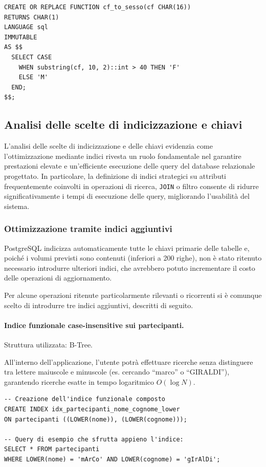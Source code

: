 \documentclass[11pt,a4paper]{article}
\begin{document}
\begin{verbatim}
CREATE OR REPLACE FUNCTION cf_to_sesso(cf CHAR(16))
RETURNS CHAR(1)
LANGUAGE sql
IMMUTABLE
AS $$
  SELECT CASE
    WHEN substring(cf, 10, 2)::int > 40 THEN 'F'
    ELSE 'M'
  END;
$$;
\end{verbatim}

\subsection{Analisi delle scelte di indicizzazione e chiavi}

L'analisi delle scelte di indicizzazione e delle chiavi evidenzia come l'ottimizzazione mediante
indici rivesta un ruolo fondamentale nel garantire prestazioni elevate e un'efficiente
esecuzione delle query del database relazionale progettato. In particolare, la definizione di
indici strategici su attributi frequentemente coinvolti in operazioni di ricerca, \texttt{JOIN} o filtro
consente di ridurre significativamente i tempi di esecuzione delle query, migliorando
l'usabilità del sistema.

\subsubsection{Ottimizzazione tramite indici aggiuntivi}

PostgreSQL indicizza automaticamente tutte le chiavi primarie delle tabelle e, poiché i volumi
previsti sono contenuti (inferiori a 200 righe), non è stato ritenuto necessario introdurre
ulteriori indici, che avrebbero potuto incrementare il costo delle operazioni di aggiornamento.

Per alcune operazioni ritenute particolarmente rilevanti o ricorrenti si è comunque scelto di
introdurre tre indici aggiuntivi, descritti di seguito.

\paragraph{Indice funzionale case-insensitive sui partecipanti.}
Struttura utilizzata: B-Tree.

All'interno dell'applicazione, l'utente potrà effettuare ricerche senza distinguere tra lettere
maiuscole e minuscole (es. cercando ``marco'' o ``GIRALDI''), garantendo ricerche esatte in
tempo logaritmico $O(\log N)$.

\begin{verbatim}
-- Creazione dell'indice funzionale composto
CREATE INDEX idx_partecipanti_nome_cognome_lower
ON partecipanti ((LOWER(nome)), (LOWER(cognome)));

-- Query di esempio che sfrutta appieno l'indice:
SELECT * FROM partecipanti
WHERE LOWER(nome) = 'mArCo' AND LOWER(cognome) = 'gIrAlDi';
\end{verbatim}
\end{document}

